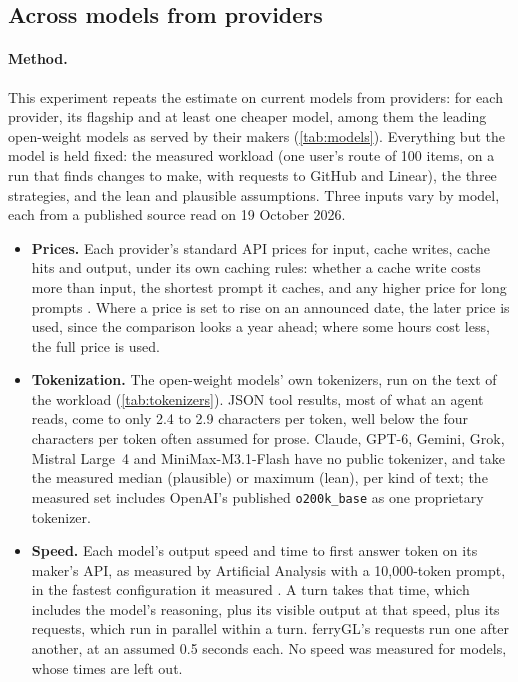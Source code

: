 \documentclass[11pt,a4paper]{article}
\newcommand{\ferry}{ferryGL}
\newcommand{\code}[1]{\texttt{#1}}
\begin{document}
\subsection{Across \CmpModels{} models from \CmpProviders{} providers}
\label{sec:eval-models}

\paragraph{Method.} This experiment repeats the estimate on \CmpModels{} current models from
\CmpProviders{} providers: for each provider, its flagship and at least one cheaper model, among
them the leading open-weight models as served by their makers (\cref{tab:models}). Everything
but the model is held fixed: the measured workload (one user's route of 100 items, on a run that
finds \CmpChanges{} changes to make, with \CmpRequests{} requests to GitHub and Linear), the
three strategies, and the lean and plausible assumptions. Three inputs vary by model, each from
a published source read on 19 October 2026.
\begin{itemize}
  \item \textbf{Prices.} Each provider's standard API prices for input, cache writes, cache hits
    and output, under its own caching rules: whether a cache write costs more than input, the
    shortest prompt it caches, and any higher price for long prompts \cite{anthropic2026pricing,
    anthropic2026caching, openai2026pricing, google2026pricing, xai2026pricing,
    deepseek2026pricing, moonshot2026pricing, alibaba2026pricing, zai2026pricing,
    minimax2026pricing, mistral2026pricing}. Where a price is set to rise on an announced date,
    the later price is used, since the comparison looks a year ahead; where some hours cost
    less, the full price is used.
  \item \textbf{Tokenization.} The open-weight models' own tokenizers, run on the text of the
    workload (\cref{tab:tokenizers}). JSON tool results, most of what an agent reads, come to
    only 2.4 to 2.9 characters per token, well below the four characters per token often assumed
    for prose. Claude, GPT-6, Gemini, Grok, Mistral Large~4 and MiniMax-M3.1-Flash have no public
    tokenizer, and take the measured median (plausible) or maximum (lean), per kind of text; the
    measured set includes OpenAI's published \code{o200k\_base} as one proprietary tokenizer.
  \item \textbf{Speed.} Each model's output speed and time to first answer token on its maker's
    API, as measured by Artificial Analysis with a 10,000-token prompt, in the fastest
    configuration it measured \cite{artificialanalysis2026}. A turn takes that time, which
    includes the model's reasoning, plus its visible output at that speed, plus its requests,
    which run in parallel within a turn. \ferry's requests run one after another, at an assumed
    0.5 seconds each. No speed was measured for \CmpUntimed{} models, whose times are left out.
\end{itemize}
\end{document}

